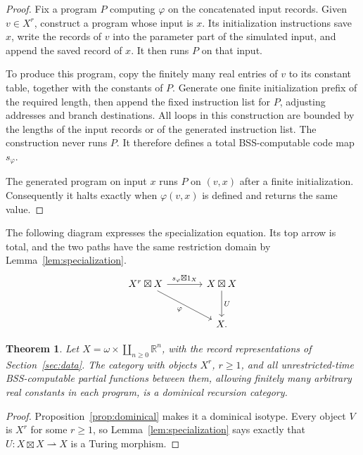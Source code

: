 \documentclass[11pt]{article}
\newtheorem{theorem}{Theorem}[section]
\newcommand{\R}{\mathbb R}
\newcommand{\pfn}{\rightharpoonup}
\begin{document}
\begin{proof}
Fix a program $P$ computing $\varphi$ on the concatenated input
records. Given $v\in X^r$, construct a program whose input is $x$.
Its initialization instructions save $x$, write the records of $v$
into the parameter part of the simulated input, and append the
saved record of $x$. It then runs $P$ on that input.

To produce this program, copy the finitely many real entries of $v$
to its constant table, together with the constants of $P$.
Generate one finite initialization prefix of the required length,
then append the fixed instruction list for $P$, adjusting addresses
and branch destinations. All loops in this construction are bounded
by the lengths of the input records or of the generated instruction
list. The construction never runs $P$. It therefore defines a total
BSS-computable code map $s_\varphi$.

The generated program on input $x$ runs $P$ on $(v,x)$ after a
finite initialization. Consequently it halts exactly when
$\varphi(v,x)$ is defined and returns the same value.
\end{proof}

\begin{samepage}
The following diagram expresses the specialization equation.
Its top arrow is total, and the two paths have the same restriction
domain by Lemma~\ref{lem:specialization}.
\[
\begin{tikzcd}[column sep=large,row sep=large]
 X^r\boxtimes X
   \arrow[r,"s_\varphi\boxtimes1_X"]
   \arrow[dr,"\varphi"']
   &X\boxtimes X\arrow[d,"U"]\\
   &X .
\end{tikzcd}
\]
\end{samepage}
\begin{theorem}\label{thm:main}
Let $X=\omega\times\coprod_{n\geq0}\R^n$, with the record
representations of Section~\ref{sec:data}. The category with objects
$X^r$, $r\geq1$, and all unrestricted-time BSS-computable partial
functions between them, allowing finitely many arbitrary real
constants in each program, is a dominical recursion category.
\end{theorem}

\begin{proof}
Proposition~\ref{prop:dominical} makes it a dominical isotype.
Every object $V$ is $X^r$ for some $r\geq1$, so
Lemma~\ref{lem:specialization} says exactly that
$U:X\boxtimes X\pfn X$ is a Turing morphism.
\end{proof}
\end{document}
